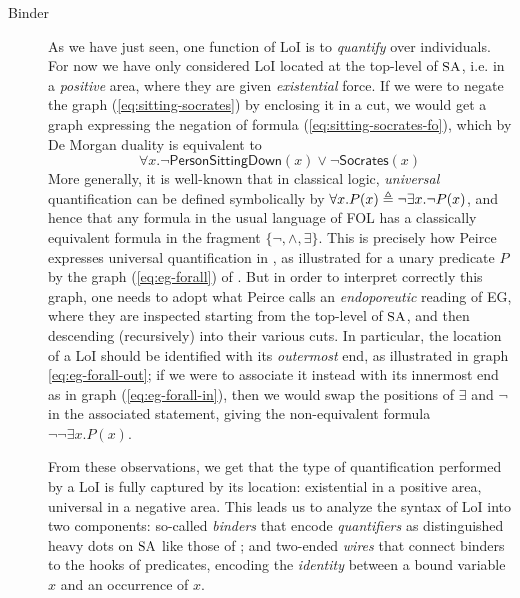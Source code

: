 \begin{description}
  \item[Binder] As we have just seen, one function of LoI is to \emph{quantify}
  over individuals. For now we have only considered LoI located at the top-level
  of $\small\textsc{SA}$, i.e. in a \emph{positive} area, where they are given
  \emph{existential} force. If we were to negate the graph
  (\ref{eq:sitting-socrates}) by enclosing it in a cut, we would get a graph
  expressing the negation of formula (\ref{eq:sitting-socrates-fo}), which by De
  Morgan duality is equivalent to
  $$\forall x. \neg \mathsf{PersonSittingDown}(x) \vee \neg
  \mathsf{Socrates}(x)$$
  More generally, it is well-known that in classical logic, \emph{universal}
  quantification can be defined symbolically by $\forall x. P(x) \triangleq \neg
  \exists x. \neg P(x)$, and hence that any formula in the usual language of FOL
  has a classically equivalent formula in the fragment $\{\neg, \land,
  \exists\}$. This is precisely how Peirce expresses universal quantification in
  , as illustrated for a unary predicate $P$ by the graph
  (\ref{eq:eg-forall}) of . But in order to interpret
  correctly this graph, one needs to adopt what Peirce calls an
  \emph{endoporeutic} reading of EG, where they are inspected starting from the top-level
  of $\small\textsc{SA}$, and then descending (recursively) into their various cuts. In
  particular, the location of a LoI should be identified with its
  \emph{outermost} end, as illustrated in graph \ref{eq:eg-forall-out}; if we
  were to associate it instead with its innermost end as in graph
  (\ref{eq:eg-forall-in}), then we would swap the positions of $\exists$ and
  $\neg$ in the associated statement, giving the non-equivalent formula $\neg
  \neg \exists x. P(x)$.

  From these observations, we get that the type of quantification performed by a
  LoI is fully captured by its location: existential in a positive area,
  universal in a negative area. This leads us to analyze the syntax of LoI into
  two components: so-called \emph{binders} that encode \emph{quantifiers} as
  distinguished heavy dots on $\small\textsc{SA}$ like those of
  ; and two-ended \emph{wires} that connect binders to the hooks of
  predicates, encoding the \emph{identity} between a bound variable $x$ and an
  occurrence of $x$.
  

\end{description}
